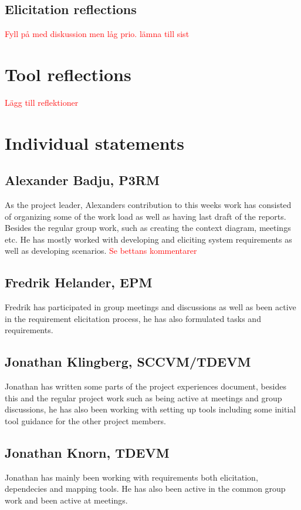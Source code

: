\documentclass[10pt]{article}
\newcommand\todo[1]{\textcolor{red}{#1}}
\begin{document}
\subsection{Elicitation reflections}
\todo{Fyll på med diskussion men låg prio. lämna till sist}


\section{Tool reflections}
\noindent
\todo{Lägg till reflektioner}


\section{Individual statements}
\noindent
\subsection{Alexander Badju, P3RM}
As the project leader, Alexanders contribution to this weeks work has consisted of organizing some of the work load as well as having last draft of the reports. Besides the regular group work, such as creating the context diagram, meetings etc. He has mostly worked with developing and eliciting system requirements as well as developing scenarios. 
\todo{Se bettans kommentarer}
\subsection{Fredrik Helander, EPM}
Fredrik has participated in group meetings and discussions as well as been active in the requirement elicitation process, he has also formulated tasks and requirements.  
\subsection{Jonathan Klingberg, SCCVM/TDEVM}
Jonathan has written some parts of the project experiences document, besides this and the regular project work such as being active at meetings and group discussions, he has also been working with setting up tools including some initial tool guidance for the other project members.
\subsection{Jonathan Knorn, TDEVM}
Jonathan has mainly been working with requirements both elicitation, dependecies and mapping tools. He has also been active in the common group work and been active at meetings.
\end{document}
